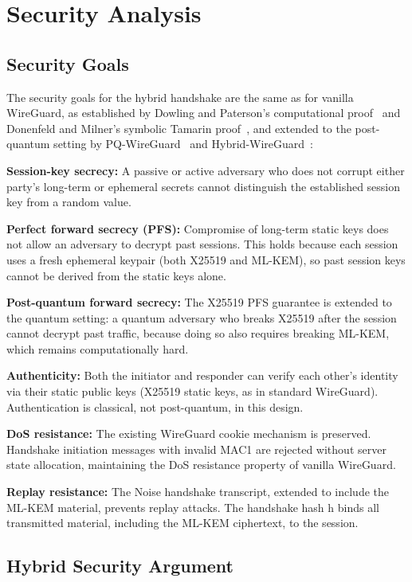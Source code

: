\chapter{Security Analysis}
\label{chap:security}

\section{Security Goals}

The security goals for the hybrid handshake are the same as for vanilla WireGuard, as established by Dowling and Paterson's computational proof~\cite{dowling2018wireguard} and Donenfeld and Milner's symbolic Tamarin proof~\cite{donenfeld2018formal}, and extended to the post-quantum setting by PQ-WireGuard~\cite{hulsing2021pqwireguard} and Hybrid-WireGuard~\cite{lafourcade2025hybrid}:

\textbf{Session-key secrecy:} A passive or active adversary who does not corrupt either party's long-term or ephemeral secrets cannot distinguish the established session key from a random value.

\textbf{Perfect forward secrecy (PFS):} Compromise of long-term static keys does not allow an adversary to decrypt past sessions. This holds because each session uses a fresh ephemeral keypair (both X25519 and ML-KEM), so past session keys cannot be derived from the static keys alone.

\textbf{Post-quantum forward secrecy:} The X25519 PFS guarantee is extended to the quantum setting: a quantum adversary who breaks X25519 after the session cannot decrypt past traffic, because doing so also requires breaking ML-KEM, which remains computationally hard.

\textbf{Authenticity:} Both the initiator and responder can verify each other's identity via their static public keys (X25519 static keys, as in standard WireGuard). Authentication is classical, not post-quantum, in this design.

\textbf{DoS resistance:} The existing WireGuard cookie mechanism is preserved. Handshake initiation messages with invalid MAC1 are rejected without server state allocation, maintaining the DoS resistance property of vanilla WireGuard.

\textbf{Replay resistance:} The Noise handshake transcript, extended to include the ML-KEM material, prevents replay attacks. The handshake hash h binds all transmitted material, including the ML-KEM ciphertext, to the session.

\section{Hybrid Security Argument}

